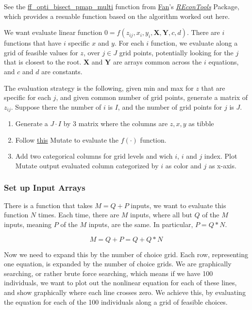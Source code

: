 \documentclass[
]{book}
\providecommand{\tightlist}{%
  \setlength{\itemsep}{0pt}\setlength{\parskip}{0pt}}
\begin{document}
See the \href{https://fanwangecon.github.io/REconTools/reference/ff_opti_bisect_pmap_multi.html}{ff\_opti\_bisect\_pmap\_multi} function from \href{https://fanwangecon.github.io/}{Fan}'s \emph{\href{https://fanwangecon.github.io/REconTools/}{REconTools}} Package, which provides a resuable function based on the algorithm worked out here.

We want evaluate linear function \(0=f(z_{ij}, x_i, y_i, \textbf{X}, \textbf{Y}, c, d)\). There are \(i\) functions that have \(i\) specific \(x\) and \(y\). For each \(i\) function, we evaluate along a grid of feasible values for \(z\), over \(j\in J\) grid points, potentially looking for the \(j\) that is closest to the root. \(\textbf{X}\) and \(\textbf{Y}\) are arrays common across the \(i\) equations, and \(c\) and \(d\) are constants.

The evaluation strategy is the following, given min and max for \(z\) that are specific for each \(j\), and given common number of grid points, generate a matrix of \(z_{ij}\). Suppose there the number of \(i\) is \(I\), and the number of grid points for \(j\) is \(J\).

\begin{enumerate}
\def\labelenumi{\arabic{enumi}.}
\tightlist
\item
  Generate a \(J \cdot I\) by \(3\) matrix where the columns are \(z,x,y\) as tibble
\item
  Follow \href{https://fanwangecon.github.io/R4Econ/function/mutatef/fs_funceval.html}{this} Mutate to evaluate the \(f(\cdot)\) function.
\item
  Add two categorical columns for grid levels and wich \(i\), \(i\) and \(j\) index. Plot Mutate output evaluated column categorized by \(i\) as color and \(j\) as x-axis.
\end{enumerate}

\hypertarget{set-up-input-arrays-1}{%
\subsubsection{Set up Input Arrays}\label{set-up-input-arrays-1}}

There is a function that takes \(M=Q+P\) inputs, we want to evaluate this function \(N\) times. Each time, there are \(M\) inputs, where all but \(Q\) of the \(M\) inputs, meaning \(P\) of the \(M\) inputs, are the same. In particular, \(P=Q*N\).

\[M = Q+P = Q + Q*N\]

Now we need to expand this by the number of choice grid. Each row, representing one equation, is expanded by the number of choice grids. We are graphically searching, or rather brute force searching, which means if we have 100 individuals, we want to plot out the nonlinear equation for each of these lines, and show graphically where each line crosses zero. We achieve this, by evaluating the equation for each of the 100 individuals along a grid of feasible choices.
\end{document}
